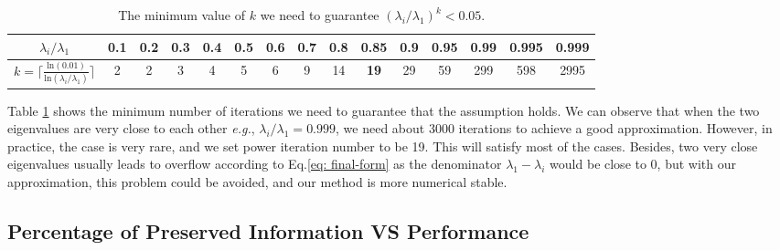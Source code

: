 \documentclass{article}
\begin{document}
\begin{table}[!htb]
\begin{center}
\setlength\tabcolsep{4pt}
\begin{tabular}{ccccccccccccccc}
\hline
$\lambda_i/\lambda_1$ & 0.1& 0.2& 0.3 & 0.4 & 0.5 & 0.6 & 0.7 & 0.8 & \textbf{0.85} & 0.9 & 0.95 & 0.99 & 0.995 & 0.999 \\ \hline
$k = \lceil \frac{\text{ln}(0.01)}{\text{ln}(\lambda_i/\lambda_1)} \rceil $   & 2 & 2 & 3 & 4 & 5 & 6 & 9 & 14  & \textbf{19}   & 29  & 59   & 299  & 598   & 2995  \\ \hline
\end{tabular}
\caption{The minimum value of $k$ we need to guarantee $(\lambda_i/\lambda_1)^k<0.05$.}
\label{tab: kmin}
\end{center}
\end{table}

Table \ref{tab: kmin} shows the minimum number of iterations we need to guarantee that the assumption holds. We can observe that when the two eigenvalues are very close to each other \emph{e.g.}, $\lambda_i/\lambda_1=0.999$, we need about 3000 iterations to achieve a good approximation. However, in practice, the case is very rare, and we set power iteration number to be 19. This will satisfy most of the cases. Besides, two very close eigenvalues usually leads to overflow according to Eq.\ref{eq: final-form} as the denominator $\lambda_1 - \lambda_i$ would be close to 0, but with our approximation, this problem could be avoided, and our method is more numerical stable.

\subsection{Percentage of Preserved Information VS Performance}
\end{document}
